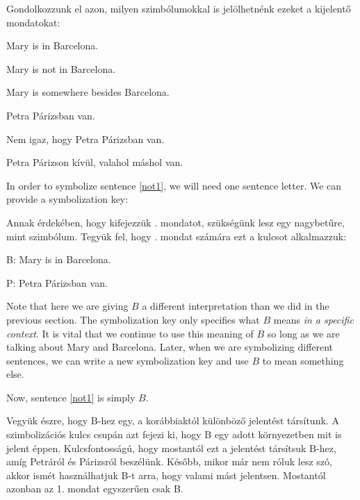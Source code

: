 Gondolkozzunk el azon, milyen szimbólumokkal is jelölhetnénk ezeket a kijelentő mondatokat:
\begin{earg}
\item[\ex{not1}] Mary is in Barcelona.
\item[\ex{not2}] Mary is not in Barcelona.
\item[\ex{not3}] Mary is somewhere besides Barcelona.
\end{earg}

\begin{earg}
\item[\ex{not1}] Petra Párizsban van.
\item[\ex{not2}] Nem igaz, hogy Petra Párizsban van.
\item[\ex{not3}] Petra Párizson kívül, valahol máshol van.
\end{earg}

In order to symbolize sentence \ref{not1}, we will need one sentence letter. We can provide a symbolization key:

Annak érdekében, hogy kifejezzük . mondatot, szükségünk lesz egy nagybetűre, mint szimbólum.
Tegyük fel, hogy . mondat számára ezt a kulcsot alkalmazzuk:
\begin{ekey}
\item[B:]Mary is in Barcelona.
\end{ekey}

\begin{ekey}
\item[P:]Petra Párizsban van.
\end{ekey}

Note that here we are giving $B$ a different interpretation than we did in the previous section. The symbolization key only specifies what $B$ means \emph{in a specific context}. It is vital that we continue to use this meaning of $B$ so long as we are talking about Mary and Barcelona. Later, when we are symbolizing different sentences, we can write a new symbolization key and use $B$ to mean something else.

Now, sentence \ref{not1} is simply $B$. 

Vegyük észre, hogy B-hez egy, a korábbiaktól különböző jelentést társítunk. A szimbolizációs kulcs csupán azt fejezi ki, hogy B egy adott környezetben mit is jelent éppen.
Kulcsfontosságú, hogy mostantól ezt a jelentést társítsuk B-hez, amíg Petráról és Párizsról beszélünk. Később, mikor már nem róluk lesz szó, akkor ismét használhatjuk B-t arra, hogy valami mást jelentsen. Mostantól azonban az 1. mondat egyszerűen csak B.

